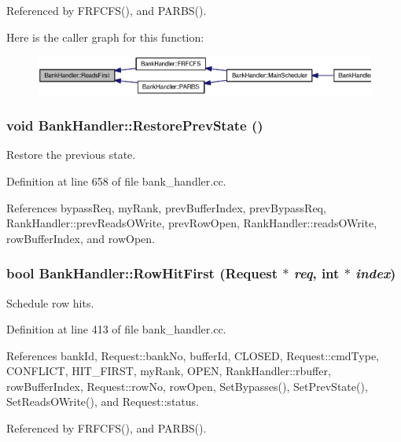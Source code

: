 Referenced by FRFCFS(), and PARBS().

Here is the caller graph for this function:\nopagebreak
\begin{figure}[H]
\begin{center}
\leavevmode
\includegraphics[width=420pt]{classBankHandler_e9a0e0abbb74e6f7b3d8de3421d3e81c_icgraph}
\end{center}
\end{figure}
\subsubsection[{RestorePrevState}]{\setlength{\rightskip}{0pt plus 5cm}void BankHandler::RestorePrevState ()}\label{classBankHandler_234ac01c0585c08d466b35b020607375}


Restore the previous state. 



Definition at line 658 of file bank\_\-handler.cc.

References bypassReq, myRank, prevBufferIndex, prevBypassReq, RankHandler::prevReadsOWrite, prevRowOpen, RankHandler::readsOWrite, rowBufferIndex, and rowOpen.
\subsubsection[{RowHitFirst}]{\setlength{\rightskip}{0pt plus 5cm}bool BankHandler::RowHitFirst ({\bf Request} $\ast$ {\em req}, \/  int $\ast$ {\em index})}\label{classBankHandler_8efd50148051d7bab539f733defbc057}


Schedule row hits. 



Definition at line 413 of file bank\_\-handler.cc.

References bankId, Request::bankNo, bufferId, CLOSED, Request::cmdType, CONFLICT, HIT\_\-FIRST, myRank, OPEN, RankHandler::rbuffer, rowBufferIndex, Request::rowNo, rowOpen, SetBypasses(), SetPrevState(), SetReadsOWrite(), and Request::status.

Referenced by FRFCFS(), and PARBS().

